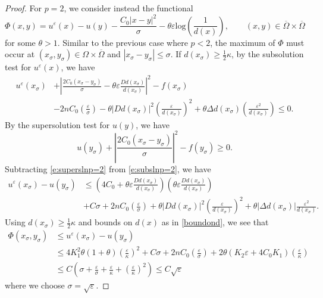 \documentclass[12pt,reqno]{amsart}
\numberwithin{figure}{section}
\theoremstyle{plain}
\theoremstyle{remark}
\numberwithin{equation}{section}
\begin{document}
\begin{proof}
\noindent For $p=2$, we consider instead the functional 
\begin{equation*}
    \Phi(x,y) = u^\varepsilon(x) - u(y) - \frac{C_0|x-y|^2}{\sigma} - \theta \varepsilon \mathrm{log}\left(\frac{1}{d(x)}\right), \qquad (x,y)\in \overline{\Omega}\times \overline{\Omega}
\end{equation*}
for some $\theta>1$. Similar to the previous case where $p<2$, the maximum of $\Phi$ must occur at $(x_\sigma,y_\sigma)\in \Omega\times\overline{\Omega}$ and $|x_\sigma - y_\sigma|\leq \sigma$. If $d(x_\sigma)\geq \frac{1}{2}\kappa$, by the subsolution test for $u^\varepsilon(x)$, we have
\begin{align}\label{e:subslnp=2}
    u^\varepsilon(x_\sigma)&+ \left|\frac{2C_0(x_\sigma - y_\sigma)}{\sigma} - \theta \varepsilon \frac{D d(x_\sigma)}{d(x_\sigma)}\right|^2  -f(x_\sigma) \nonumber\\
    &- 2nC_0\left(\frac{\varepsilon}{\sigma}\right) - \theta |D d(x_\sigma)|^2 \left(\frac{\varepsilon}{d(x_\sigma)}\right)^2  + \theta \Delta d(x_\sigma)\left(\frac{\varepsilon^2}{d(x_\sigma)}\right) \leq 0.
\end{align}
By the supersolution test for $u(y)$, we have
\begin{equation}\label{e:superslnp=2}
    u(y_\sigma) + \left|\frac{2C_0(x_\sigma - y_\sigma)}{\sigma}\right|^2 - f(y_\sigma) \geq 0.
\end{equation}
Subtracting \eqref{e:superslnp=2} from \eqref{e:subslnp=2}, we have
\begin{align*}
    u^\varepsilon(x_\sigma) - u(y_\sigma) &\leq \left(4C_0+ \theta\varepsilon\frac{D d(x_\sigma)}{d(x_\sigma)}\right)\left(\theta \varepsilon \frac{ D d(x_\sigma)}{d(x_\sigma)}\right) \\
    &+ C\sigma + 2nC_0 \left(\frac{\varepsilon}{\sigma}\right)+ \theta |D d(x_\sigma)|^2 \left(\frac{\varepsilon}{d(x_\sigma)}\right)^2 + \theta|\Delta d(x_\sigma)| \frac{\varepsilon^2}{d(x_\sigma)}.
\end{align*}
Using $d(x_\sigma)\geq \frac{1}{2}\kappa$ and bounds on $d(x)$ as in \eqref{boundond}, we see that
\begin{align}\label{p=2a}
    \Phi(x_\sigma,y_\sigma)&\leq u^\varepsilon(x_\sigma) - u(y_\sigma)\nonumber \\
    &\leq 4K_1^2\theta(1+\theta)\left(\frac{\varepsilon}{\kappa}\right)^2 + C\sigma + 2nC_0\left( \frac{\varepsilon}{\sigma}\right) + 2\theta(K_2\varepsilon+4C_0K_1)\left(\frac{\varepsilon}{\kappa}\right)\nonumber\\
    &\leq C\left(\sigma+\frac{\varepsilon}{\sigma} + \frac{\varepsilon}{\kappa} + \left(\frac{\varepsilon}{\kappa}\right)^2\right) \leq C\sqrt{\varepsilon}
\end{align}
where we choose $\sigma = \sqrt{\varepsilon}$. 


\end{proof}
\end{document}

